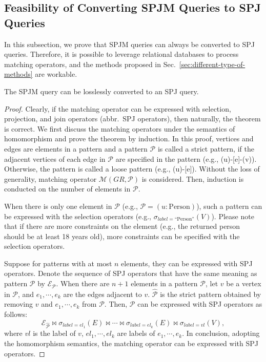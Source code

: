 \subsection{Feasibility of Converting SPJM Queries to SPJ Queries}
In this subsection, we prove that SPJM queries can always be converted to SPJ queries.
Therefore, it is possible to leverage relational databases to process matching operators, and the methods proposed in Sec.~\ref{sec:different-type-of-methods} are workable.

\begin{theorem}
    \label{theorem:spjm-to-spj}
    The SPJM query can be losslessly converted to an SPJ query.
\end{theorem}
\begin{proof}
    Clearly, if the matching operator can be expressed with selection, projection, and join operators (abbr.~SPJ operators), then naturally, the theorem is correct.
    We first discuss the matching operators under the semantics of homomorphism and prove the theorem by induction.
    In this proof, vertices and edges are elements in a pattern and a pattern $\mathcal{P}$ is called a strict pattern, if the adjacent vertices of each edge in $\mathcal{P}$ are specified in the pattern (e.g., (u)-[e]-(v)).
    Otherwise, the pattern is called a loose pattern (e.g., (u)-[e]).
    Without the loss of generality, matching operator $\mathcal{M}(GR, \mathcal{P})$ is considered.
    Then, induction is conducted on the number of elements in $\mathcal{P}$.

    When there is only one element in $\mathcal{P}$ (e.g., $\mathcal{P}=(u:\text{Person})$), such a pattern can be expressed with the selection operators (e.g., $\sigma_{label=\text{``Person''}}(V)$).
    Please note that if there are more constraints on the element (e.g., the returned person should be at least 18 years old), more constraints can be specified with the selection operators.

    Suppose for patterns with at most $n$ elements, they can be expressed with SPJ operators.
    Denote the sequence of SPJ operators that have the same meaning as pattern $\mathcal{P}$ by $\mathcal{E}_{\mathcal{P}}$.
    When there are $n+1$ elements in a pattern $\mathcal{P}$, let $v$ be a vertex in $\mathcal{P}$, and $e_1, \cdots, e_k$ are the edges adjacent to $v$. %
    $\widehat{\mathcal{P}}$ is the strict pattern obtained by removing $v$ and $e_1, \cdots, e_k$ from $\mathcal{P}$.
    Then, $\mathcal{P}$ can be expressed with SPJ operators as follows:
    \begin{equation*}
        \mathcal{E}_{\widehat{\mathcal{P}}} \Join \sigma_{label=el_1}(E) \Join \cdots \Join \sigma_{label=el_k}(E) \Join \sigma_{label=vl}(V),
    \end{equation*}
    where $vl$ is the label of $v$, $el_1, \cdots, el_k$ are labels of $e_1, \cdots, e_k$.
    In conclusion, adopting the homomorphism semantics, the matching operator can be expressed with SPJ operators.


\end{proof}
